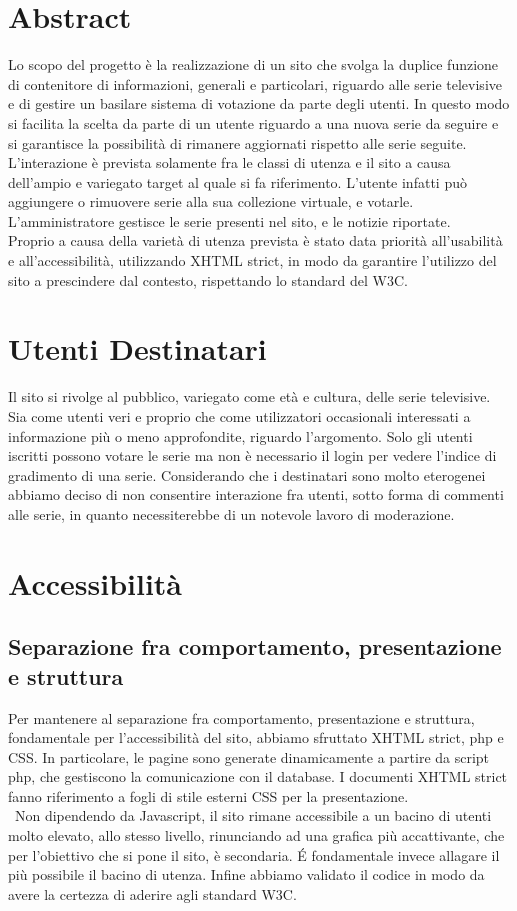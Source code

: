 \documentclass{tecweb}
\begin{document}
	\section{Abstract}
	Lo scopo del progetto è la realizzazione di un sito che svolga la duplice funzione di contenitore di informazioni, generali e particolari, riguardo alle serie televisive e di gestire un basilare sistema di votazione da parte degli utenti. In questo modo si facilita la scelta da parte di un utente riguardo a una nuova serie da seguire e si garantisce la possibilità di rimanere aggiornati rispetto alle serie seguite. \\
	L'interazione è prevista solamente fra le classi di utenza e il sito a causa dell'ampio e variegato target al quale si fa riferimento. L'utente infatti può aggiungere o rimuovere serie alla sua collezione virtuale, e votarle. L'amministratore gestisce le serie presenti nel sito, e le notizie riportate. \\
	Proprio a causa della varietà di utenza prevista è stato data priorità all'usabilità e all'accessibilità, utilizzando XHTML strict, in modo da garantire l'utilizzo del sito a prescindere dal contesto, rispettando lo standard del W3C.
	\newpage
	\section{Utenti Destinatari}
	Il sito si rivolge al pubblico, variegato come età e cultura, delle serie televisive. Sia come utenti veri e proprio che come utilizzatori occasionali interessati a informazione più o meno approfondite, riguardo l'argomento. Solo gli utenti iscritti possono votare le serie ma non è necessario il login per vedere l'indice di gradimento di una serie. Considerando che i destinatari sono molto eterogenei abbiamo deciso di non consentire interazione fra utenti, sotto forma di commenti alle serie, in quanto necessiterebbe di un notevole lavoro di moderazione.
	\newpage
	
	
	\section{Accessibilità} \label{Utenti destinatari}
	\subsection{Separazione fra comportamento, presentazione e struttura}
	Per mantenere al separazione fra comportamento, presentazione e struttura, fondamentale per l'accessibilità del sito, abbiamo sfruttato XHTML strict, php e CSS. In particolare, le pagine sono generate dinamicamente a partire da script php, che gestiscono la comunicazione con il database. I documenti XHTML strict fanno riferimento a fogli di stile esterni CSS per la presentazione.\\\
	Non dipendendo da Javascript, il sito rimane accessibile a un bacino di utenti molto elevato, allo stesso livello, rinunciando ad una grafica più accattivante, che per l'obiettivo che si pone il sito, è secondaria. \'E fondamentale invece allagare il più possibile il bacino di utenza.
	Infine abbiamo validato il codice in modo da avere la certezza di aderire agli standard W3C.
\end{document}
